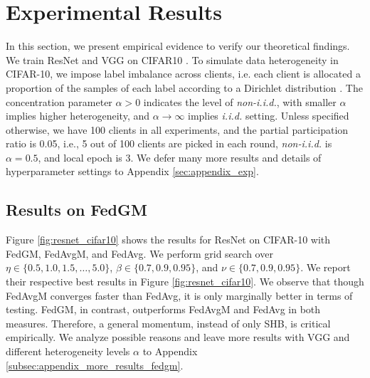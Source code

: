 \section{Experimental Results}
\label{sec:experiments}

In this section, we present empirical evidence to verify our theoretical findings. We train ResNet \citep{He2016DeepResNet} and VGG \citep{Simonyan14VGG} on CIFAR10 \citep{Krizhevsky2009CIFAR}. To simulate data heterogeneity in CIFAR-10, we impose label imbalance across clients, i.e. each client is allocated a proportion of the samples of each label according to a Dirichlet distribution \citep{Hsu2019MeasuringTE, Yurochkin2019BayesianNF}. The concentration parameter $\alpha>0$ indicates the level of \textit{non-i.i.d.}, with smaller $\alpha$ implies higher heterogeneity, and $\alpha\to\infty$ implies \textit{i.i.d.} setting. Unless specified otherwise, we have 100 clients in all experiments, and the partial participation ratio is 0.05, i.e., 5 out of 100 clients are picked in each round, \textit{non-i.i.d.} is $\alpha=0.5$, and local epoch is 3. We defer many more results and details of hyperparameter settings to Appendix \ref{sec:appendix_exp}.

\subsection{Results on FedGM}
\label{subsec:exp_fedgm}

Figure \ref{fig:resnet_cifar10} shows the results for ResNet on CIFAR-10 with FedGM, FedAvgM, and FedAvg. We perform grid search over $\eta\in\{0.5,1.0,1.5,\dots,5.0\}$, $\beta\in\{0.7,0.9,0.95\}$, and $\nu\in\{0.7,0.9,0.95\}$. We report their respective best results in Figure \ref{fig:resnet_cifar10}. We observe that though FedAvgM converges faster than FedAvg, it is only marginally better in terms of testing. FedGM, in contrast, outperforms FedAvgM and FedAvg in both measures. Therefore, a general momentum, instead of only SHB, is critical empirically. We analyze possible reasons and leave more results with VGG and different heterogeneity levels $\alpha$ to Appendix \ref{subsec:appendix_more_results_fedgm}.

\iffalse

